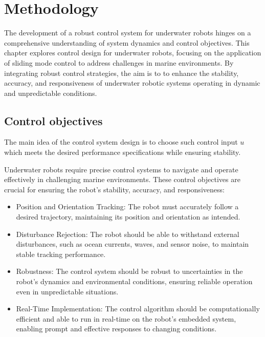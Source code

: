 \chapter{Methodology}
\label{chap:ctrl}





    The development of a robust control system for underwater robots hinges on a 
    comprehensive understanding of system dynamics and control objectives.
    This chapter explores control design for underwater robots, focusing on the application 
    of sliding mode control to address challenges in marine environments. By integrating 
    robust control strategies, the aim is to to enhance the stability, accuracy, and 
    responsiveness of underwater robotic systems operating in dynamic and unpredictable conditions.

\section{Control objectives}

    The main idea of the control system design is to choose such control input $u$ which 
    meets the desired performance specifications while ensuring stability.

    Underwater robots require precise control systems to navigate and operate effectively
    in challenging marine environments. These control objectives are crucial for ensuring
    the robot's stability, accuracy, and responsiveness:
    \begin{itemize}
        \item Position and Orientation Tracking:
            The robot must accurately follow a desired trajectory, maintaining its position
            and orientation as intended.
        \item Disturbance Rejection:
            The robot should be able to withstand external disturbances, such as ocean
            currents, waves, and sensor noise, to maintain stable tracking performance.
        \item Robustness:
            The control system should be robust to uncertainties in the robot's dynamics
            and environmental conditions, ensuring reliable operation even in unpredictable
            situations.
        \item Real-Time Implementation:
            The control algorithm should be computationally efficient and able to run in
            real-time on the robot's embedded system, enabling prompt and effective
            responses to changing conditions.
    \end{itemize}

